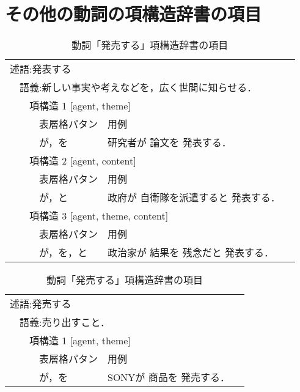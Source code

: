 \newpage

\section{その他の動詞の項構造辞書の項目}
\label{sec:sonota}

\begin{table}[htbp]
\begin{center}
\caption{動詞「発表する」項構造辞書の項目}
\small
\begin{tabular}{||llll|p{7cm}l||} \hline\hline
\multicolumn{5}{||l}{述語:発表する} &  \\
 & \multicolumn{4}{l}{語義:新しい事実や考えなどを，広く世間に知らせる．} &  \\
 &  & \multicolumn{3}{l}{項構造 1 [agent, theme]} &  \\
 &  &  & 表層格パタン & 用例 &  \\\cline{4-5}
 &  &  & が，を & 研究者が 論文を 発表する． &  \\
 &  & \multicolumn{3}{l}{項構造 2 [agent, content]} &  \\
 &  &  & 表層格パタン & 用例 &  \\\cline{4-5}
 &  &  & が，と & 政府が 自衛隊を派遣すると 発表する． &  \\
 &  & \multicolumn{3}{l}{項構造 3 [agent, theme, content]} &  \\
 &  &  & 表層格パタン & 用例 &  \\\cline{4-5}
 &  &  & が，を，と & 政治家が 結果を 残念だと 発表する． &  \\\hline\hline
\end{tabular}
\label{tab:pred2}
\end{center}

\begin{center}
\caption{動詞「発売する」項構造辞書の項目}
\small
\begin{tabular}{||llll|p{7cm}l||} \hline\hline
\multicolumn{5}{||l}{述語:発売する} &  \\
 & \multicolumn{4}{l}{語義:売り出すこと．} &  \\
 &  & \multicolumn{3}{l}{項構造 1 [agent, theme]} &  \\
 &  &  & 表層格パタン & 用例 &  \\\cline{4-5}
 &  &  & が，を & SONYが 商品を 発売する． &  \\\hline\hline
\end{tabular}
\label{tab:pred3}
\end{center}


\end{table}
